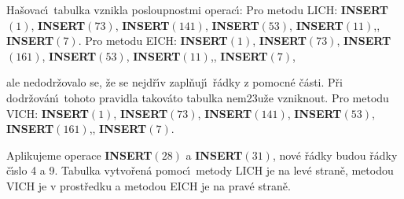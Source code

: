 \flushpar Ha\v sovac\'\i\ tabulka vznikla posloupnostmi operac\'\i :\newline 
Pro metodu LICH:\newline 
{\bf INSERT$(1)$}, {\bf INSERT$(73)$}, {\bf INSERT$(141)$}, 
{\bf INSERT$(53)$}, {\bf INSERT$(11)$},, {\bf INSERT$
(7)$}.\newline 
Pro metodu EICH:\newline 
{\bf INSERT$(1)$}, {\bf INSERT$(73)$}, {\bf INSERT$(161)$}, 
{\bf INSERT$(53)$}, {\bf INSERT$(11)$},, {\bf INSERT$
(7)$},

\flushpar ale nedodr\v zovalo se, \v ze se nejd\v r\'\i v zapl\v nuj\'\i\ \v r\'adky z 
pomocn\'e \v c\'asti.  P\v ri dodr\v zov\'an\'\i\ tohoto pravidla takov\'ato tabulka 
nem\accent23u\v ze vznik\-nout.\newline 
Pro metodu VICH:\newline 
{\bf INSERT$(1)$}, {\bf INSERT$(73)$}, {\bf INSERT$(141)$}, 
{\bf INSERT$(53)$}, {\bf INSERT$(161)$},, {\bf INSERT$(7)$}. 

\flushpar Aplikujeme operace {\bf INSERT$(28)$} a {\bf INSERT$(31
)$}, nov\'e \v r\'ad\-ky 
budou \v r\'adky \v c\'\i slo 4 a 9. Tabulka vytvo\v ren\'a pomoc\'\i\ 
metody LICH je na lev\'e stran\v e, metodou VICH je v 
prost\v redku a metodou EICH je na prav\'e stran\v e.

